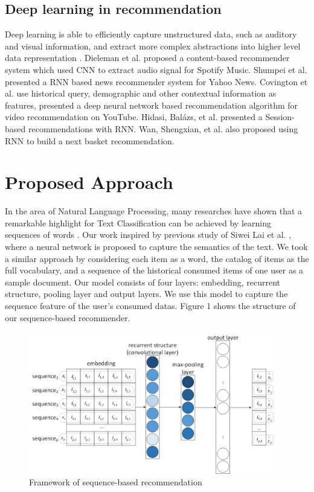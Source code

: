 \documentclass[runningheads]{llncs}
\begin{document}
\subsection{Deep learning in recommendation}
Deep learning is able to efficiently capture unstructured data, such as auditory and visual information, and extract more complex abstractions into higher level data representation \cite{20}. Dieleman et al. \cite{8} proposed a content-based recommender system which used CNN to extract audio signal for Spotify Music. Shumpei et al. \cite{9} presented a RNN based news recommender system for Yahoo News. Covington et al. \cite{10} use historical query, demographic and other contextual information as features, presented a deep neural network based recommendation algorithm for video recommendation on YouTube. Hidasi, Balázs, et al. \cite{11} presented a Session-based recommendations with RNN. Wan, Shengxian, et al. \cite{15} also proposed using RNN to build a next basket recommendation.

\section{Proposed Approach}

In the area of Natural Language Processing, many researches have shown that a remarkable highlight for Text Classification can be achieved by learning sequences of words \cite{21}. Our work inspired by previous study of Siwei Lai et al. \cite{13}, where a neural network is proposed to capture the semantics of the text. We took a similar approach by considering each item as a word, the catalog of items as the full vocabulary, and a sequence of the historical consumed items of one user as a sample document. Our model consists of four layers: embedding, recurrent structure, pooling layer and output layers. We use this model to capture the sequence feature of the user's consumed datas. Figure 1 shows the structure of our sequence-based recommender.
\begin{figure}[htbp]
\centerline
{\includegraphics[height=6.2cm,width=\linewidth]{structer.jpg}}
\caption{Framework of sequence-based recommendation }
\end{figure}
\end{document}
